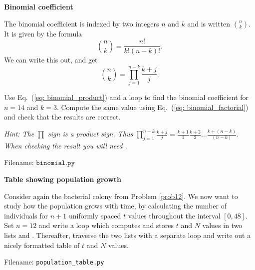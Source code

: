\newpage

\begin{Problem}{\textbf{Binomial coefficient}}\label{prob26}

\noindent The binomial coefficient is indexed by two integers $n$ and $k$ and is written
$\binom{n}{k}$. It is given by the formula
\begin{equation}\label{eq: binomial_factorial}
\binom{n}{k} = \frac{n!}{k!(n-k)!}.
\end{equation}
We can write this out, and get
\begin{equation}\label{eq: binomial_product}
\binom{n}{k} = \prod_{j = 1}^{n - k}\frac{k + j}{j}.
\end{equation}

Use Eq.~(\ref{eq: binomial_product}) and a  loop to find the binomial coefficient
for $n = 14$ and $k = 3$. Compute the same value using Eq.~(\ref{eq: binomial_factorial})
and check that the results are correct.

\emph{Hint: The $\prod$ sign is a product sign. Thus
$\prod_{j = 1}^{n - k}\frac{k + j}{j} = \frac{k + 1}{1}\frac{k + 2}{2}
\dots\frac{k + (n - k)}{(n - k)}$. When checking the result you will need
.}

Filename: $\texttt{binomial.py}$
\end{Problem}




\begin{Problem}{\textbf{Table showing population growth}} \label{population_table}

\noindent Consider again the bacterial colony from Problem \ref{prob12}. We now want to
study how the population grows with time, by calculating the number
of individuals for $n + 1$ uniformly spaced $t$ values throughout the interval
$[0, 48]$. Set $n = 12$ and write a  loop which computes and stores
$t$ and $N$ values in two lists  and . Thereafter,
traverse the two lists with a separate  loop and
write out a nicely formatted table of $t$ and $N$
values.

Filename: \texttt{population\_table.py}
\end{Problem}

